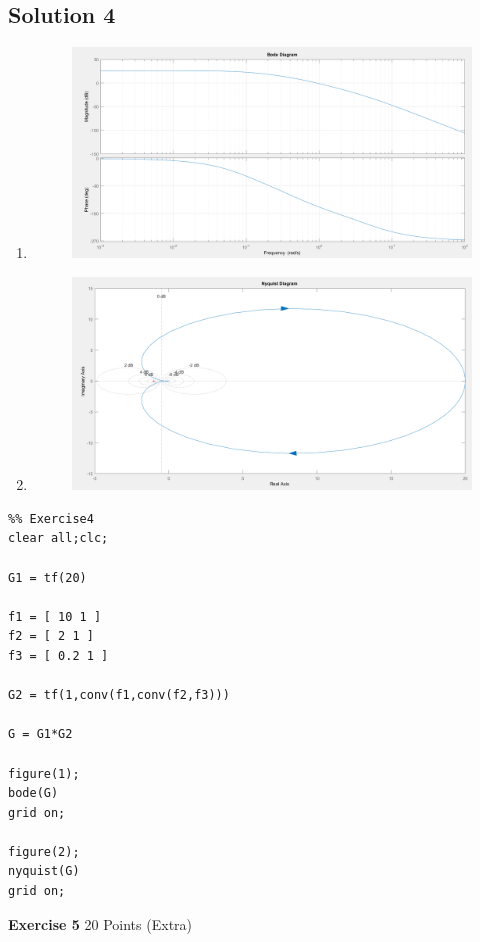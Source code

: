 \documentclass[a4paper,11pt]{article}
\begin{document}
\subsection*{Solution 4}
\begin{enumerate}
	\item
	\vskip0.4cm
	\begin{figure}[H]  \includegraphics [scale=0.45] {Figures/exercise4-1} \end{figure}
	\item 
	\vskip0.4cm
	\begin{figure}[H]  \includegraphics [scale=0.45] {Figures/exercise4-2} \end{figure}
\end{enumerate}

\begin{lstlisting}
%% Exercise4
clear all;clc;

G1 = tf(20)

f1 = [ 10 1 ]
f2 = [ 2 1 ]
f3 = [ 0.2 1 ]

G2 = tf(1,conv(f1,conv(f2,f3)))

G = G1*G2

figure(1);
bode(G)
grid on;

figure(2);
nyquist(G)
grid on;
\end{lstlisting}
\vskip0.8cm
{\Large \noindent \bf Exercise 5} \hfill					20 Points ({\sc Extra}) \\
\end{document}
